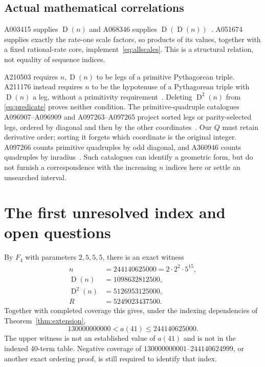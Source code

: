\documentclass[11pt]{article}
\newcommand{\D}{\operatorname{D}}
\theoremstyle{definition}
\begin{document}
\subsection{Actual mathematical correlations}
A003415 supplies $\D(n)$ and A068346 supplies
$\D(\D(n))$~\cite{derivatives}. A051674 supplies exactly the
rate-one scale factors, so products of its values, together with a
fixed rational-rate core, implement~\eqref{eq:allscales}. This is a
structural relation, not equality of sequence indices.

A210503 requires $n,\D(n)$ to be legs of a primitive Pythagorean
triple. A211176 instead requires $n$ to be the hypotenuse of a
Pythagorean triple with $\D(n)$ a leg, without a primitivity
requirement~\cite{triples}. Deleting $\D^2(n)$ from
\eqref{eq:predicate} proves neither condition. The primitive-quadruple
catalogues A096907--A096909 and A097263--A097265 project sorted legs
or parity-selected legs, ordered by diagonal and then by the other
coordinates~\cite{catalogues}. Our $Q$ must retain derivative order;
sorting it forgets which coordinate is the original integer. A097266
counts primitive quadruples by odd diagonal, and A360946 counts
quadruples by inradius~\cite{counts}. Such catalogues can identify a
geometric form, but do not furnish a correspondence with the increasing
$n$ indices here or settle an unsearched interval.

\section{The first unresolved index and open questions}\label{sec:endpoint}
By $F_4$ with parameters $2,5,5,5$, there is an exact witness
\begin{align*}
 n&=244140625000=2\cdot2^2\cdot5^{15},\\
 \D(n)&=1098632812500,\\
 \D^2(n)&=5126953125000,\\
 R&=5249023437500.
\end{align*}
Together with completed coverage this gives, under the indexing
dependencies of Theorem~\ref{thm:extension},
\begin{equation}\label{eq:endpoint}
 130000000000<a(41)\le244140625000.
\end{equation}
The upper witness is not an established value of $a(41)$ and is not in
the indexed 40-term table. Negative coverage of
$130000000001$--$244140624999$, or another exact ordering proof,
is still required to identify that index.
\end{document}
